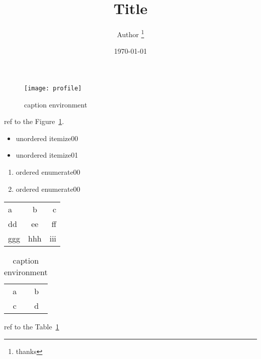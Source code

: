\documentclass{article}
\title{Title}
\author{Author \thanks{thanks}}
\date{\today}
\begin{document}
\maketitle

\listoffigures

\listoftables

\newpage

\begin{figure}[h]
    \centering
    \texttt{[image: profile]}
    \caption{caption environment}
    \label{fig:00} %
\end{figure}

ref to the Figure~\ref{fig:00}.

\begin{itemize}
    \item unordered itemize00
    \item unordered itemize01
\end{itemize}

\begin{enumerate}
    \item ordered enumerate00
    \item ordered enumerate00
\end{enumerate}

\begin{tabular}{||l|c|r||}
    \hline
    a & b & c\\
    dd & ee & ff\\
    ggg & hhh & iii\\
    \hline \hline
\end{tabular}

\begin{table}[h!]
    \centering
    \begin{tabular}{|c|c|}
        \hline
        a & b\\
        c & d\\
        \hline
    \end{tabular}
    \caption{caption environment}
    \label{table:00}
\end{table}

ref to the Table~\ref{table:00}
\end{document}
